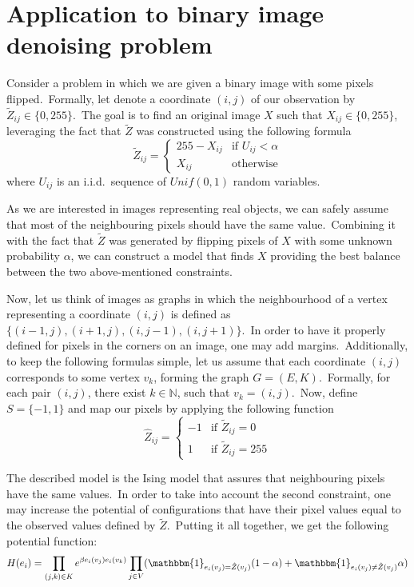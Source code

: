 \documentclass[shortabstract, english, lic]{iithesis}
\theoremstyle{default_theorem_style}\newtheorem{theorem}{Theorem}
\theoremstyle{default_theorem_style}\newtheorem{definition}{Definition}
\begin{document}
\section{Application to binary image denoising problem} \label{sec:binary_images_problem}

Consider a problem in which we are given a binary image with some pixels flipped.\ Formally, let denote a coordinate
$(i, j)$ of our observation by $\tilde{Z}_{ij} \in \{0, 255\}$.\ The goal is to find an original image $X$ such that
$X_{ij} \in \{0, 255\}$, leveraging the fact that $\tilde{Z}$ was constructed using the following formula
$$
\tilde{Z}_{ij} =
\begin{cases}
  255 - X_{ij} &\text{if $U_{ij} < \alpha$}\\
  X_{ij} &\text{otherwise}
\end{cases}
$$
where $U_{ij}$ is an i.i.d.\ sequence of $Unif(0, 1)$ random variables.\newline

\noindent As we are interested in images representing real objects, we can safely assume that most of the neighbouring
pixels should have the same value.\ Combining it with the fact that $\tilde{Z}$ was generated by flipping pixels of
$X$ with some unknown probability $\alpha$, we can construct a model that finds $X$ providing the best balance between the
two above-mentioned constraints.\newline

\noindent Now, let us think of images as graphs in which the neighbourhood of a vertex representing a
coordinate $(i, j)$ is defined as $\{(i - 1, j), (i + 1, j), (i, j - 1), (i, j + 1)\}$.\ In
order to have it properly defined for pixels in the corners on an image, one may add margins.\ Additionally, to keep
the following formulas simple, let us assume that each coordinate $(i, j)$ corresponds to some
vertex $v_k$, forming the graph $G = (E, K)$.\ Formally, for each pair $(i, j)$, there exist
$k \in \mathbb{N}$, such that $v_k = (i, j)$.\ Now, define $S = \{-1, 1\}$ and map our pixels by applying the
following function
$$
\hat{Z}_{ij} =
\begin{cases}
  -1 &\text{if $\tilde{Z}_{ij} = 0$}\\
  1 &\text{if $\tilde{Z}_{ij} = 255$}
\end{cases}
$$

\noindent The described model is the Ising model that assures that neighbouring pixels have the same values.\ In order
to take into account the second constraint, one may increase the potential of configurations that have their pixel
values equal to the observed values defined by $\tilde{Z}$.\ Putting it all together, we get the following potential
function:
$$
H(e_i) = \prod\limits_{(j, k) \in K} e^{\beta e_i(v_j)e_i(v_k)}
\prod\limits_{j \in V}(\mathbbm{1}_{e_i(v_j) = \hat{Z}(v_j)}(1 - \alpha) +
\mathbbm{1}_{e_i(v_j) \neq \hat{Z}(v_j)}\alpha)
$$
\end{document}
